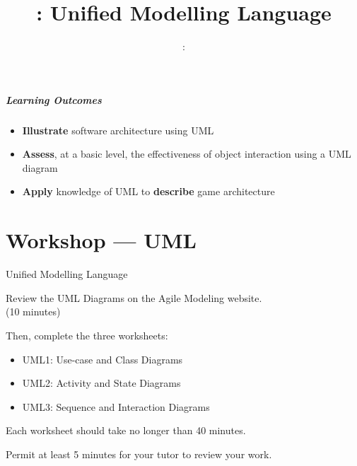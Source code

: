 \usepackage{../../beamerthemeFalmouthGamesAcademy}
\usepackage{multimedia}
\graphicspath{ {../../} }


\usepackage[normalem]{ulem}
\usepackage{wasysym}

\usepackage{pdfpages}

\usetikzlibrary{arrows,automata}




\title{\sessionnumber: Unified Modelling Language}
\subtitle{\modulecode: \moduletitle}

\frame{\titlepage} 

\begin{frame}
	\frametitle{Learning Outcomes}
	\begin{itemize}
		\item \textbf{Illustrate} software architecture using UML
		\item \textbf{Assess}, at a basic level, the effectiveness of object interaction using a UML diagram
		\item \textbf{Apply} knowledge of UML to \textbf{describe} game architecture
	\end{itemize}
\end{frame}

\part{Workshop --- UML}
\frame{\partpage}

\begin{frame}{Unified Modelling Language}

	Review the UML Diagrams on the Agile Modeling website. \\
	
	(10 minutes) \\
	
	\vspace{1em}
	
	Then, complete the three worksheets:

	\begin{itemize}
		\item  UML1: Use-case and Class Diagrams
		\item  UML2: Activity and State Diagrams
		\item  UML3: Sequence and Interaction Diagrams
	\end{itemize}

	Each worksheet should take no longer than 40 minutes. \\
	
	\vspace{1em}
	
	Permit at least 5 minutes for your tutor to review your work.

\end{frame}

